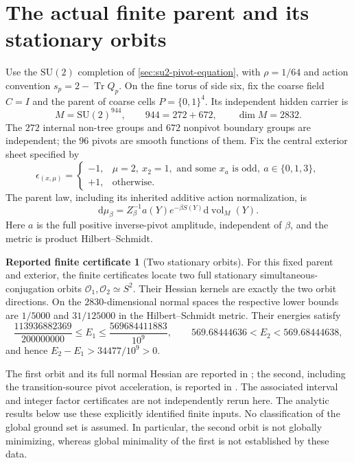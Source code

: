 \documentclass[11pt,oneside,openany]{book}
\theoremstyle{definition}
\newtheorem{certificate}[certificate]{Reported finite certificate}
\theoremstyle{remark}
\newcommand{\dd}{\mathrm d}
\newcommand{\Tr}{\operatorname{Tr}}
\newcommand{\SU}{\mathrm{SU}}
\newcommand{\src}[2]{\cite[#2]{#1}}
\begin{document}
\section{The actual finite parent and its stationary orbits}
\label{sec:compact-orbit-data}
Use the $\SU(2)$ completion of
\cref{sec:su2-pivot-equation}, with $\rho=1/64$ and action convention
$s_p=2-\Tr Q_p$. On the fine torus of side six, fix the coarse field
$C=I$ and the parent of coarse cells $P=\{0,1\}^4$. Its independent
hidden carrier is
\[
 M=\SU(2)^{944},\qquad 944=272+672,\qquad \dim M=2832.
\]
The $272$ internal non-tree groups and $672$ nonpivot boundary groups
are independent; the $96$ pivots are smooth functions of them. Fix
the central exterior sheet specified by
\begin{equation}\label{eq:central-sheet}
 \epsilon_{(x,\mu)}=
 \begin{cases}
 -1,&\mu=2,\ x_2=1,\text{ and some }x_a\text{ is odd},\ a\in\{0,1,3\},\\
 +1,&\text{otherwise}.
 \end{cases}
\end{equation}
The parent law, including its inherited additive action normalization,
is
\begin{equation}\label{eq:actual-parent-law}
 \dd\mu_\beta=Z_\beta^{-1}a(Y)e^{-\beta S(Y)}\dd\operatorname{vol}_M(Y).
\end{equation}
Here $a$ is the full positive inverse-pivot amplitude, independent of
$\beta$, and the metric is product Hilbert--Schmidt.

\begin{certificate}[Two stationary orbits]
\label{def:two-orbit-input}
For this fixed parent and exterior, the finite certificates locate two
full stationary simultaneous-conjugation orbits
$\mathcal O_1,\mathcal O_2\simeq S^2$. Their Hessian kernels are
exactly the two orbit directions. On the $2830$-dimensional normal
spaces the respective lower bounds are $1/5000$ and $31/125000$ in
the Hilbert--Schmidt metric. Their energies satisfy
\[
 \frac{113936882369}{200000000}\le E_1
          \le\frac{569684411883}{10^9},\qquad
 569.68444636<E_2<569.68444638,
\]
and hence $E_2-E_1>34477/10^9>0$.
\end{certificate}
The first orbit and its full normal Hessian are reported in
\src{F12}{V89--V90}; the second, including the transition-source pivot
acceleration, is reported in \src{F13}{V8}. The associated interval
and integer factor certificates are not independently rerun here.
The analytic results below use these explicitly identified finite
inputs. No classification of the global ground set is assumed.
In particular, the second orbit is not globally minimizing, whereas
global minimality of the first is not established by these data.
\end{document}
